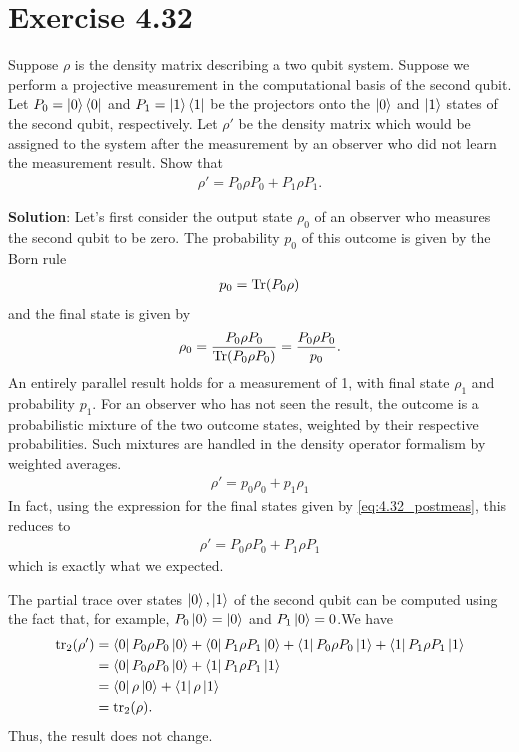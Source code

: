 \documentclass{book}
\begin{document}
\section*{Exercise 4.32}
    Suppose $\rho$ is the density matrix describing a two qubit system. Suppose we perform a projective measurement in the computational basis of the second qubit. Let $P_0 = \ket{0}\bra{0}$ and $P_1 = \ket{1}\bra{1}$ be the projectors onto the $\ket{0}$ and $\ket{1}$ states of the second qubit, respectively. Let $\rho'$ be the density matrix which would be assigned to the system after the measurement by an observer who did not learn the measurement result. Show that
    \begin{align}
        \rho' = P_0 \rho P_0 + P_1 \rho P_1.
    \end{align}

    \textbf{Solution}: Let's first consider the output state $\rho_0$ of an observer who measures the second qubit to be zero. The probability $p_0$ of this outcome is given by the Born rule
    \begin{align}
        p_0 = \Tr(P_0 \rho)
    \end{align}
    and the final state is given by
    \begin{align} \label{eq:4.32_postmeas}
        \rho_0 = \frac{P_0 \rho P_0}{\Tr(P_0 \rho P_0)} = \frac{P_0 \rho P_0}{p_0}.
    \end{align}
    An entirely parallel result holds for a measurement of 1, with final state $\rho_1$ and probability $p_1$. For an observer who has not seen the result, the outcome is a probabilistic mixture of the two outcome states, weighted by their respective probabilities. Such mixtures are handled in the density operator formalism by weighted averages.
    \begin{align}
        \rho' = p_0 \rho_0 + p_1 \rho_1
    \end{align}
    In fact, using the expression for the final states given by \eqref{eq:4.32_postmeas}, this reduces to 
    \begin{align}
        \rho' = P_0 \rho P_0 + P_1 \rho P_1
    \end{align}
    which is exactly what we expected. 

    The partial trace over states $\ket{0}, \ket{1}$ of the second qubit can be computed using the fact that, for example, $P_0 \ket{0} = \ket{0}$ and $P_1 \ket{0} = 0$.We have
    \begin{align}
    \begin{aligned}
        \tr_2(\rho') &= \bra{0}P_0 \rho P_0 \ket{0} + \bra{0}P_1 \rho P_1 \ket{0} + \bra{1}P_0 \rho P_0 \ket{1} + \bra{1}P_1 \rho P_1 \ket{1} \\
        &= \bra{0}P_0 \rho P_0 \ket{0} + \bra{1}P_1 \rho P_1 \ket{1} \\
        &= \bra{0}\rho\ket{0} + \bra{1}\rho\ket{1} \\
        &=\tr_2(\rho).
    \end{aligned}
    \end{align}
    Thus, the result does not change. 
\end{document}
